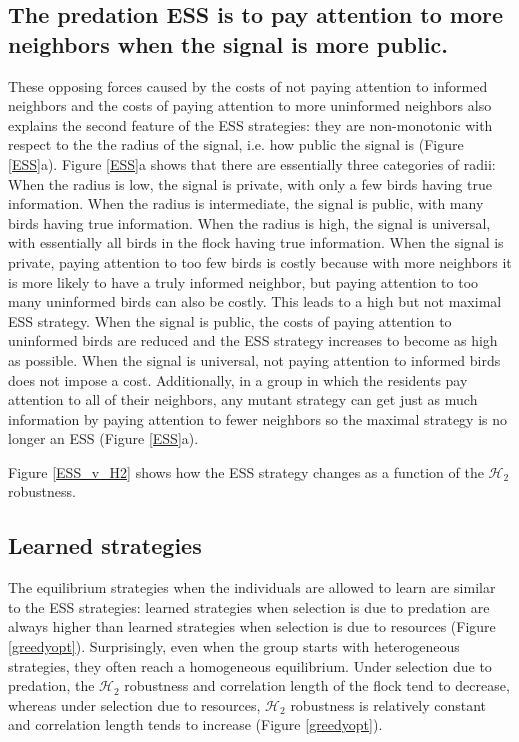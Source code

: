 \documentclass{article}
\begin{document}
\subsection{The predation ESS is to pay attention to more neighbors when the signal is more public.}
These opposing forces caused by the costs of not paying attention to informed neighbors  and the costs of paying attention to more uninformed neighbors  also explains the second feature of the ESS strategies: they are non-monotonic with respect to the the radius of the signal, i.e. how public the signal is (Figure \ref{ESS}a). Figure \ref{ESS}a shows that there are essentially three categories of radii: When the radius is low, the signal is private, with only a few birds having true information. When the radius is intermediate, the signal is public, with many birds having true information. When the radius is high, the signal is universal, with essentially all birds in the flock having true information. When the signal is private, paying attention to too few birds is costly because with more neighbors it is more likely to have a truly informed neighbor, but paying attention to too many uninformed birds can also be costly. This leads to a high but not maximal ESS strategy. When the signal is public, the costs of paying attention to uninformed birds are reduced and the ESS strategy increases to become as high as possible. When the signal is universal, not paying attention to informed birds does not impose a cost. Additionally, in a group in which the residents pay attention to all of their neighbors, any mutant strategy can get just as much information by paying attention to fewer neighbors so the maximal strategy is no longer an ESS (Figure \ref{ESS}a).

Figure \ref{ESS_v_H2} shows how the ESS strategy changes as a function of the $\mathscr{H}_2$ robustness.

\subsection{Learned strategies }
The equilibrium strategies when the individuals are allowed to learn are similar to the ESS strategies: learned strategies when selection is due to predation are always higher than learned strategies when selection is due to resources (Figure \ref{greedyopt}). Surprisingly, even when the group starts with heterogeneous strategies, they often reach a homogeneous equilibrium. Under selection due to predation, the $\mathscr{H}_2$ robustness and correlation length of the flock tend to decrease, whereas under selection due to resources, $\mathscr{H}_2$ robustness is relatively constant and correlation length tends to increase (Figure \ref{greedyopt}).
\end{document}

